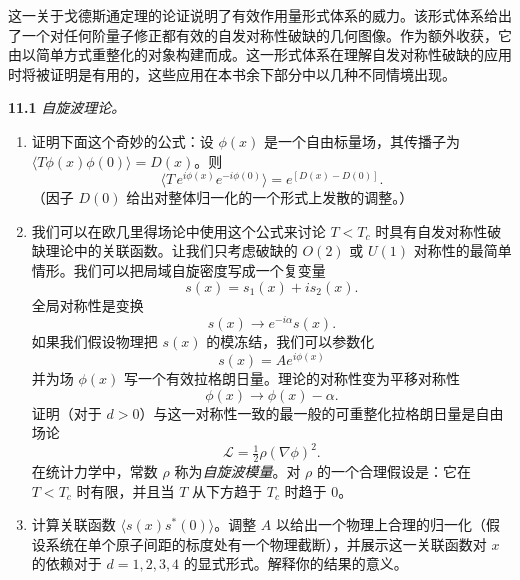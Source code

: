 这一关于戈德斯通定理的论证说明了有效作用量形式体系的威力。该形式体系给出了一个对任何阶量子修正都有效的自发对称性破缺的几何图像。作为额外收获，它由以简单方式重整化的对象构建而成。这一形式体系在理解自发对称性破缺的应用时将被证明是有用的，这些应用在本书余下部分中以几种不同情境出现。

\problems

\textbf{11.1} \emph{自旋波理论。}
\begin{enumerate}[label=(\alph*)]
  \item 证明下面这个奇妙的公式：设 $\phi(x)$ 是一个自由标量场，其传播子为 $\langle T\phi(x)\phi(0)\rangle = D(x)$。则
    \begin{equation}
      \langle T\,e^{i\phi(x)}e^{-i\phi(0)} \rangle
      = e^{\left[ D(x) - D(0) \right]} .
    \end{equation}
    （因子 $D(0)$ 给出对整体归一化的一个形式上发散的调整。）
  \item 我们可以在欧几里得场论中使用这个公式来讨论 $T < T_c$ 时具有自发对称性破缺理论中的关联函数。让我们只考虑破缺的 $O(2)$ 或 $U(1)$ 对称性的最简单情形。我们可以把局域自旋密度写成一个复变量
    \begin{equation}
      s(x) = s_1(x) + is_2(x) .
    \end{equation}
    全局对称性是变换
    \begin{equation}
      s(x) \to e^{-i\alpha}s(x) .
    \end{equation}
    如果我们假设物理把 $s(x)$ 的模冻结，我们可以参数化
    \begin{equation}
      s(x) = Ae^{i\phi(x)}
    \end{equation}
    并为场 $\phi(x)$ 写一个有效拉格朗日量。理论的对称性变为平移对称性
    \begin{equation}
      \phi(x) \to \phi(x) - \alpha .
    \end{equation}
    证明（对于 $d > 0$）与这一对称性一致的最一般的可重整化拉格朗日量是自由场论
    \begin{equation}
      \mathcal{L} = \tfrac{1}{2}\rho(\nabla\phi)^2 .
    \end{equation}
    在统计力学中，常数 $\rho$ 称为\emph{自旋波模量}。对 $\rho$ 的一个合理假设是：它在 $T < T_c$ 时有限，并且当 $T$ 从下方趋于 $T_c$ 时趋于 0。
  \item 计算关联函数 $\langle s(x)s^{*}(0)\rangle$。调整 $A$ 以给出一个物理上合理的归一化（假设系统在单个原子间距的标度处有一个物理截断），并展示这一关联函数对 $x$ 的依赖对于 $d = 1, 2, 3, 4$ 的显式形式。解释你的结果的意义。
\end{enumerate}

